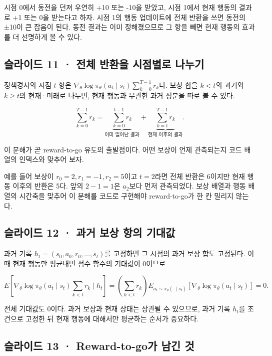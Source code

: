 \documentclass[11pt,a4paper]{article}
\begin{document}
시점 0에서 동전을 던져 우연히 +10 또는 -10을 받았고, 시점 1에서 현재 행동의 결과로 +1 또는 0을 받는다고 하자. 시점 1의 행동 업데이트에 전체 반환을 쓰면 동전의 ±10이 큰 잡음이 된다. 동전 결과는 이미 정해졌으므로 그 항을 빼면 현재 행동의 효과를 더 선명하게 볼 수 있다.\par

\subsection{슬라이드 11 · 전체 반환을 시점별로 나누기}

정책경사의 시점 $t$ 항은 $\nabla_\theta\log\pi_\theta(a_t\mid s_t)\sum_{k=0}^{T-1}r_k$다. 보상 합을 $k<t$의 과거와 $k\ge t$의 현재·미래로 나누면, 현재 행동과 무관한 과거 성분을 따로 볼 수 있다.\par

\[
\sum_{k=0}^{T-1}r_k
=\underbrace{\sum_{k=0}^{t-1}r_k}_{\text{이미 일어난 결과}}
+\underbrace{\sum_{k=t}^{T-1}r_k}_{\text{현재 이후의 결과}}.
\]

이 분해가 곧 reward-to-go 유도의 출발점이다. 어떤 보상이 언제 관측되는지 코드 배열의 인덱스와 맞추어 보자.\par

예를 들어 보상이 $r_0=2,r_1=-1,r_2=5$이고 $t=2$라면 전체 반환은 6이지만 현재 행동 이후의 반환은 5다. 앞의 $2-1=1$은 $a_2$보다 먼저 관측되었다. 보상 배열과 행동 배열의 시간축을 맞추어 이 분해를 코드로 구현해야 reward-to-go가 한 칸 밀리지 않는다.\par

\subsection{슬라이드 12 · 과거 보상 항의 기대값}

과거 기록 $h_t=(s_0,a_0,r_0,\ldots,s_t)$를 고정하면 그 시점의 과거 보상 합도 고정된다. 이때 현재 행동만 평균내면 점수 함수의 기대값이 0이므로\par

\[
E\!\left[
\nabla_\theta\log\pi_\theta(a_t\mid s_t)
\sum_{k<t}r_k\mid h_t\right]
=\left(\sum_{k<t}r_k\right)
E_{a_t\sim\pi_\theta(\cdot\mid s_t)}
[\nabla_\theta\log\pi_\theta(a_t\mid s_t)]
=0.
\]

전체 기대값도 0이다. 과거 보상과 현재 상태는 상관될 수 있으므로, 과거 기록 $h_t$를 조건으로 고정한 뒤 현재 행동에 대해서만 평균하는 순서가 중요하다.\par

\subsection{슬라이드 13 · Reward-to-go가 남긴 것}
\end{document}
